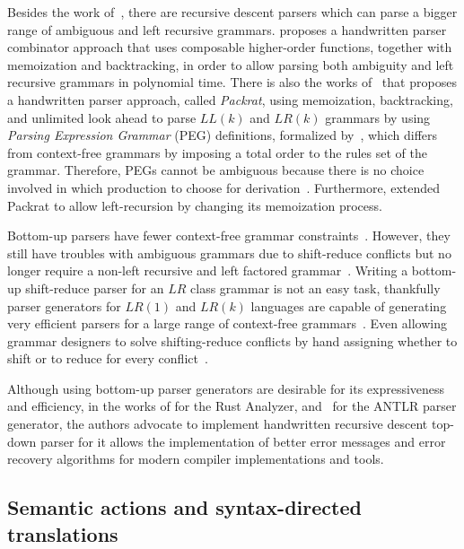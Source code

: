 \documentclass[
  oneside,
  english,
  coorientadorbanca,
  noabntexcite
]{ufsc-thesis-rn46-2019}
\begin{document}
Besides the work of~\textcite{pratt1973operatorprecedence}, there are recursive descent parsers which can parse a bigger range of ambiguous and left recursive grammars.
\textcite{10.1007/978-3-540-77442-6_12} proposes a handwritten parser combinator approach that uses composable higher-order functions, together with memoization and backtracking, in order to allow parsing both ambiguity and left recursive grammars in polynomial time.
There is also the works of~\textcite{10.1145/583852.581483} that proposes a handwritten parser approach, called \textit{Packrat}, using memoization, backtracking, and unlimited look ahead to parse $LL(k)$ and $LR(k)$ grammars by using \textit{Parsing Expression Grammar} (PEG) definitions, formalized by~\textcite{10.1145/982962.964011}, which differs from context-free grammars by imposing a total order to the rules set of the grammar.
Therefore, PEGs cannot be ambiguous because there is no choice involved in which production to choose for derivation~\cite{10.1145/982962.964011}.
Furthermore, \textcite{10.1145/1328408.1328424} extended Packrat to allow left-recursion by changing its memoization process.

Bottom-up parsers have fewer context-free grammar constraints~\cite{Aho:2006:CPT:1177220}.
However, they still have troubles with ambiguous grammars due to shift-reduce conflicts but no longer require a non-left recursive and left factored grammar~\cite{Aho:2006:CPT:1177220}.
Writing a bottom-up shift-reduce parser for an $LR$ class grammar is not an easy task, thankfully
parser generators for $LR(1)$ and $LR(k)$ languages are capable of generating very efficient parsers for a large range of context-free grammars~\cite{Aho:2006:CPT:1177220}.
Even allowing grammar designers to solve shifting-reduce conflicts by hand assigning whether to shift or to reduce for every conflict~\cite{Aho:2006:CPT:1177220}.

Although using bottom-up parser generators are desirable for its expressiveness and efficiency, in the works of \textcite{matklad2020challenginglrparsing, matklad2020prattparsing} for the Rust Analyzer, and~\textcite{Parr13} for the ANTLR parser generator, the authors advocate to implement handwritten recursive descent top-down parser for it allows the implementation of better error messages and error recovery algorithms for modern compiler implementations and tools.

\subsection{Semantic actions and syntax-directed translations}
\end{document}
